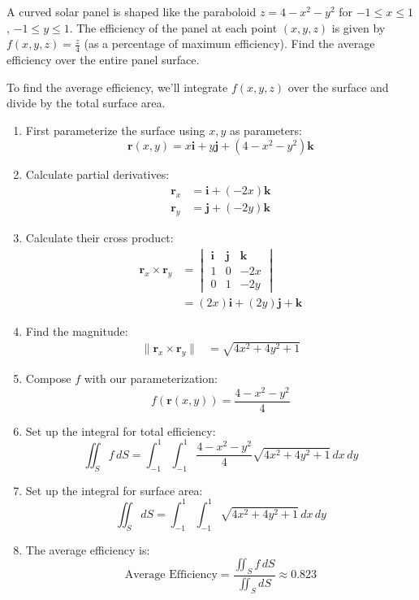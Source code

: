 \exampleline
\begin{example}
A curved solar panel is shaped like the paraboloid $z = 4 - x^2 - y^2$ for $-1 \leq x \leq 1$, $-1 \leq y \leq 1$. The efficiency of the panel at each point $(x,y,z)$ is given by $f(x,y,z) = \frac{z}{4}$ (as a percentage of maximum efficiency). Find the average efficiency over the entire panel surface.

\begin{solution}
To find the average efficiency, we'll integrate $f(x,y,z)$ over the surface and divide by the total surface area.

\begin{enumerate}
   \item First parameterize the surface using $x,y$ as parameters:
   \[
   \mathbf{r}(x,y) = x\mathbf{i} + y\mathbf{j} + (4-x^2-y^2)\mathbf{k}
   \]

   \item Calculate partial derivatives:
   \begin{align*}
       \mathbf{r}_x &= \mathbf{i} + (-2x)\mathbf{k} \\
       \mathbf{r}_y &= \mathbf{j} + (-2y)\mathbf{k}
   \end{align*}

   \item Calculate their cross product:
   \begin{align*}
       \mathbf{r}_x \times \mathbf{r}_y &= \begin{vmatrix}
       \mathbf{i} & \mathbf{j} & \mathbf{k} \\
       1 & 0 & -2x \\
       0 & 1 & -2y
       \end{vmatrix} \\
       &= (2x)\mathbf{i} + (2y)\mathbf{j} + \mathbf{k}
   \end{align*}

   \item Find the magnitude:
   \begin{align*}
       \|\mathbf{r}_x \times \mathbf{r}_y\| &= \sqrt{4x^2 + 4y^2 + 1}
   \end{align*}

   \item Compose $f$ with our parameterization:
   \[
   f(\mathbf{r}(x,y)) = \frac{4-x^2-y^2}{4}
   \]

   \item Set up the integral for total efficiency:
   \[
   \iint_S f\,dS = \int_{-1}^1\int_{-1}^1 \frac{4-x^2-y^2}{4}\sqrt{4x^2 + 4y^2 + 1}\,dx\,dy
   \]

   \item Set up the integral for surface area:
   \[
   \iint_S dS = \int_{-1}^1\int_{-1}^1 \sqrt{4x^2 + 4y^2 + 1}\,dx\,dy
   \]

   \item The average efficiency is:
   \[
   \text{Average Efficiency} = \frac{\iint_S f\,dS}{\iint_S dS} \approx 0.823
   \]
\end{enumerate}
\end{solution}
\end{example}


